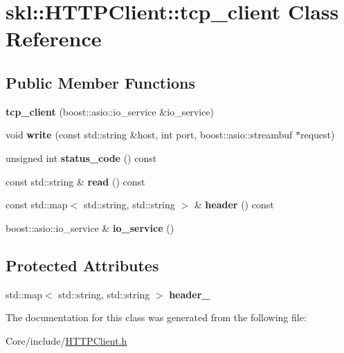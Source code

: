 \hypertarget{classskl_1_1_h_t_t_p_client_1_1tcp__client}{}\section{skl\+:\+:H\+T\+T\+P\+Client\+:\+:tcp\+\_\+client Class Reference}
\label{classskl_1_1_h_t_t_p_client_1_1tcp__client}
\subsection*{Public Member Functions}
\begin{DoxyCompactItemize}
\item 
\hypertarget{classskl_1_1_h_t_t_p_client_1_1tcp__client_a24756c715e721929ec5a250e3a738886}{}\label{classskl_1_1_h_t_t_p_client_1_1tcp__client_a24756c715e721929ec5a250e3a738886} 
{\bfseries tcp\+\_\+client} (boost\+::asio\+::io\+\_\+service \&io\+\_\+service)
\item 
\hypertarget{classskl_1_1_h_t_t_p_client_1_1tcp__client_a38d63f5fcdfd44ca86a975438363654e}{}\label{classskl_1_1_h_t_t_p_client_1_1tcp__client_a38d63f5fcdfd44ca86a975438363654e} 
void {\bfseries write} (const std\+::string \&host, int port, boost\+::asio\+::streambuf $\ast$request)
\item 
\hypertarget{classskl_1_1_h_t_t_p_client_1_1tcp__client_ac7665658f03539b0d56dbcfb36d94a13}{}\label{classskl_1_1_h_t_t_p_client_1_1tcp__client_ac7665658f03539b0d56dbcfb36d94a13} 
unsigned int {\bfseries status\+\_\+code} () const
\item 
\hypertarget{classskl_1_1_h_t_t_p_client_1_1tcp__client_a81eb88228b5096dac26ca7eb93022eae}{}\label{classskl_1_1_h_t_t_p_client_1_1tcp__client_a81eb88228b5096dac26ca7eb93022eae} 
const std\+::string \& {\bfseries read} () const
\item 
\hypertarget{classskl_1_1_h_t_t_p_client_1_1tcp__client_a3b3944b46b557c6297c957754332bf06}{}\label{classskl_1_1_h_t_t_p_client_1_1tcp__client_a3b3944b46b557c6297c957754332bf06} 
const std\+::map$<$ std\+::string, std\+::string $>$ \& {\bfseries header} () const
\item 
\hypertarget{classskl_1_1_h_t_t_p_client_1_1tcp__client_a1ea561dea489534e3db958e970ef3156}{}\label{classskl_1_1_h_t_t_p_client_1_1tcp__client_a1ea561dea489534e3db958e970ef3156} 
boost\+::asio\+::io\+\_\+service \& {\bfseries io\+\_\+service} ()
\end{DoxyCompactItemize}
\subsection*{Protected Attributes}
\begin{DoxyCompactItemize}
\item 
\hypertarget{classskl_1_1_h_t_t_p_client_1_1tcp__client_a12201b0e55a829e8ab2b73b906ec04d4}{}\label{classskl_1_1_h_t_t_p_client_1_1tcp__client_a12201b0e55a829e8ab2b73b906ec04d4} 
std\+::map$<$ std\+::string, std\+::string $>$ {\bfseries header\+\_\+}
\end{DoxyCompactItemize}


The documentation for this class was generated from the following file\+:\begin{DoxyCompactItemize}
\item 
Core/include/\hyperlink{_h_t_t_p_client_8h}{H\+T\+T\+P\+Client.\+h}\end{DoxyCompactItemize}
